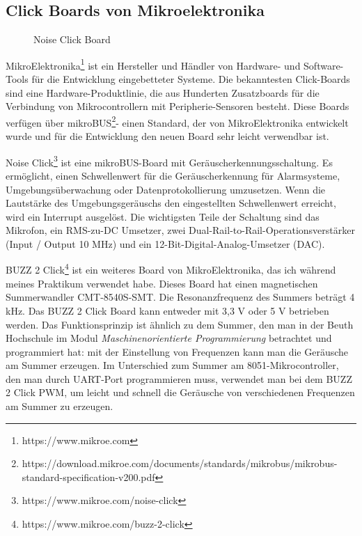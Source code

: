 \subsection{Click Boards von Mikroelektronika}
\begin{wrapfigure}{l}{0.4\textwidth}
	\centering
	\caption{Noise Click Board}
	\label{fig:click}
\end{wrapfigure}
MikroElektronika\footnote{https://www.mikroe.com} ist ein Hersteller und Händler von Hardware- und Software-Tools für die Entwicklung eingebetteter Systeme. Die bekanntesten Click-Boards sind eine Hardware-Produktlinie, die aus Hunderten Zusatzboards für die Verbindung von Mikrocontrollern mit Peripherie-Sensoren besteht. Diese Boards verfügen über mikroBUS\footnote{https://download.mikroe.com/documents/standards/mikrobus/mikrobus-standard-specification-v200.pdf}- einen Standard, der von MikroElektronika entwickelt wurde und für die Entwicklung den neuen Board sehr leicht verwendbar ist. 

Noise Click\footnote{https://www.mikroe.com/noise-click} ist eine mikroBUS-Board mit Geräuscherkennungsschaltung. Es ermöglicht, einen Schwellenwert für die Geräuscherkennung für Alarmsysteme, Umgebungsüberwachung oder Datenprotokollierung umzusetzen. Wenn die Lautstärke des Umgebungsgeräuschs den eingestellten Schwellenwert erreicht, wird ein Interrupt ausgelöst. Die wichtigsten Teile der Schaltung sind das Mikrofon, ein RMS-zu-DC Umsetzer, zwei Dual-Rail-to-Rail-Operationsverstärker (Input / Output 10 MHz) und ein 12-Bit-Digital-Analog-Umsetzer (DAC).

BUZZ 2 Click\footnote{https://www.mikroe.com/buzz-2-click} ist ein weiteres Board von MikroElektronika, das ich während meines Praktikum verwendet habe. Dieses Board hat einen magnetischen Summerwandler CMT-8540S-SMT. Die Resonanzfrequenz des Summers beträgt 4 kHz. Das BUZZ 2 Click Board kann entweder mit 3,3 V oder 5 V betrieben werden. Das Funktionsprinzip ist ähnlich zu dem Summer, den man in der Beuth Hochschule im Modul \textit{Maschinenorientierte Programmierung} betrachtet und programmiert hat: mit der Einstellung von Frequenzen kann man die Geräusche am Summer erzeugen. Im Unterschied zum Summer am 8051-Mikrocontroller, den man durch UART-Port programmieren muss, verwendet man bei dem BUZZ 2 Click PWM, um leicht und schnell die Geräusche von verschiedenen Frequenzen am Summer zu erzeugen. 

